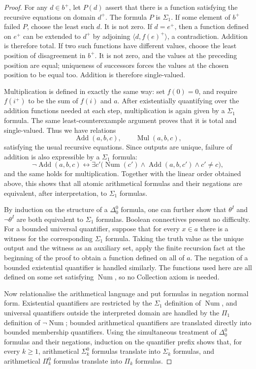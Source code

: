 \documentclass[11pt,a4paper]{article}
\theoremstyle{plain}
\theoremstyle{definition}
\theoremstyle{remark}
\begin{document}
\begin{proof}
  For any \(d\in b^+\), let \(P(d)\) assert that there is a function satisfying the recursive equations on domain \(d^+\). The formula \(P\) is \(\Sigma_1\). If some element of \(b^+\) failed \(P\), choose the least such \(d\). It is not zero. If \(d=e^+\), then a function defined on \(e^+\) can be extended to \(d^+\) by adjoining \(\langle d,f(e)^+\rangle\), a contradiction. Addition is therefore total. If two such functions have different values, choose the least position of disagreement in \(b^+\). It is not zero, and the values at the preceding position are equal; uniqueness of successors forces the values at the chosen position to be equal too. Addition is therefore single-valued.

  Multiplication is defined in exactly the same way: set \(f(0)=0\), and require \(f(i^+)\) to be the sum of \(f(i)\) and \(a\). After existentially quantifying over the addition functions needed at each step, multiplication is again given by a \(\Sigma_1\) formula. The same least-counterexample argument proves that it is total and single-valued. Thus we have relations
  \[
    \operatorname{Add}(a,b,c),\qquad
    \operatorname{Mul}(a,b,c),
  \]
  satisfying the usual recursive equations. Since outputs are unique, failure of addition is also expressible by a \(\Sigma_1\) formula:
  \[
    \neg\operatorname{Add}(a,b,c)\longleftrightarrow
    \exists c'\bigl(\operatorname{Num}(c')\wedge
    \operatorname{Add}(a,b,c')\wedge c'\ne c\bigr),
  \]
  and the same holds for multiplication. Together with the linear order obtained above, this shows that all atomic arithmetical formulas and their negations are equivalent, after interpretation, to \(\Sigma_1\) formulas.

  By induction on the structure of a \(\Delta_0^0\) formula, one can further show that \(\theta^I\) and \(\neg\theta^I\) are both equivalent to \(\Sigma_1\) formulas. Boolean connectives present no difficulty. For a bounded universal quantifier, suppose that for every \(x\in a\) there is a witness for the corresponding \(\Sigma_1\) formula. Taking the truth value as the unique output and the witness as an auxiliary set, apply the finite recursion fact at the beginning of the proof to obtain a function defined on all of \(a\). The negation of a bounded existential quantifier is handled similarly. The functions used here are all defined on some set satisfying \(\operatorname{Num}\), so no Collection axiom is needed.

  Now relationalise the arithmetical language and put formulas in negation normal form. Existential quantifiers are restricted by the \(\Sigma_1\) definition of \(\operatorname{Num}\), and universal quantifiers outside the interpreted domain are handled by the \(\Pi_1\) definition of \(\neg\operatorname{Num}\); bounded arithmetical quantifiers are translated directly into bounded membership quantifiers. Using the simultaneous treatment of \(\Delta_0^0\) formulas and their negations, induction on the quantifier prefix shows that, for every \(k\geq1\), arithmetical \(\Sigma_k^0\) formulas translate into \(\Sigma_k\) formulas, and arithmetical \(\Pi_k^0\) formulas translate into \(\Pi_k\) formulas.


\end{proof}
\end{document}
